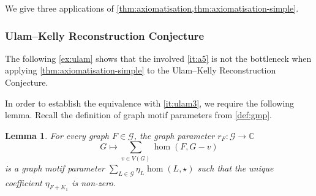 \documentclass[11pt]{scrartcl}
\theoremstyle{definition}
\theoremstyle{plain}
\newtheorem{lemma}[definition]{Lemma}
\theoremstyle{remark}
\newcommand{\G}{\mathcal{G}}
\newcommand{\C}{\mathbb{C}}
\begin{document}
    We give three applications of \cref{thm:axiomatisation,thm:axiomatisation-simple}.

    \subsubsection{Ulam--Kelly Reconstruction Conjecture}

    The following \cref{ex:ulam} shows that the involved \cref{it:a5} is not the bottleneck when applying \cref{thm:axiomatisation-simple} to the Ulam--Kelly Reconstruction Conjecture.


	\exUlam*

    In order to establish the equivalence with \cref{it:ulam3}, we require the following lemma.
    Recall the definition of graph motif parameters from \cref{def:gmp}.
    \begin{lemma}\label{lem:ulam-gmp}
		For every graph $F \in \G$, the graph parameter $r_F \colon \G \to \C$
		\[
			G \mapsto \sum_{v \in V(G)} \hom(F, G - v)
		\]
		is a graph motif parameter $\sum_{L \in \G} \eta_L \hom(L, \star)$
        such that the unique coefficient $\eta_{F + K_1}$ is non-zero.
	\end{lemma}
\end{document}
